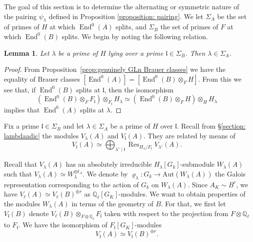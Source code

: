 \documentclass[oneside]{amsart}
\newtheorem{lemma}[theorem]{Lemma}
\theoremstyle{remark}
\newcommand{\Q}{\mathbb Q}
\newcommand{\Aut}{\mathrm{Aut}}
\newcommand{\End}{\operatorname{End}}
\newcommand{\Res}{\operatorname{Res}}
\newcommand{\gl}{\mathfrak{l}}
\numberwithin{equation}{section}
\newcommand{\QQ}{\mathbb{Q}}
\begin{document}
The goal of this section is to determine the alternating or symmetric nature of the pairing $\psi_\lambda$ defined in Proposition \ref{proposition: pairing}. We let $\Sigma_A$ be the set of primes of $H$ at which $\End^0(A)$ splits, and $\Sigma_B$ the set of primes of $F$ at which $\End^0(B)$ splits. We begin by noting the following relation.

\begin{lemma}\label{lemma:gl lambda in Sigma}
	Let $\lambda$ be a prime of $H$ lying over a prime $\gl\in \Sigma_B$. Then $\lambda\in\Sigma_A$.
\end{lemma}
\begin{proof}
	From Proposition~\ref{prop:genuinely GLn Brauer classes} we have the equality of Brauer classes
	\(
		[\End^0(A)] = [\End^0(B)\otimes_F H]
	\).
	From this we see that, if $\End^0(B)$ splits at $\gl$, then the isomorphism 
	\[
	(\End^0(B)\otimes_F F_\gl) \otimes_{F_\gl} H_\lambda \simeq (\End^0(B) \otimes_F H)\otimes_H H_\lambda
	\]
	implies that $\End^0(A)$ splits at $\lambda$.
\end{proof}


Fix a prime $\gl\in\Sigma_B$ and let $\lambda\in \Sigma_A$ be a prime of $H$ over $\gl$. Recall from \S\ref{section: lambdaadic} the modules $V_\lambda(A)$ and $V_\gl(A)$. They are related by means of
\begin{equation}\label{eq:Vgl ResVlambda}
	V_\gl(A) \simeq 
	\bigoplus_{\lambda'\mid \gl} \Res_{H_\lambda/F_\gl}V_{\lambda'}(A).
\end{equation}

Recall that $V_\lambda(A)$ has an absolutely irreducible $H_\lambda[G_k]$-submodule $W_\lambda(A)$ such that $V_\lambda(A) \simeq W_\lambda^{\oplus t_A}$. We denote by $\varrho_\lambda:G_k\to \Aut(W_\lambda(A))$ the Galois representation corresponding to the action of $G_k$ on $W_\lambda(A)$. 
Since $A_K\sim B^r$, we have $V_\ell(A)\simeq V_\ell(B)^{\oplus r}$ as $\QQ_\ell[G_K]$-modules. We want to obtain properties of  the modules $W_\lambda(A)$ in terms of the geometry of $B$. For that, we first let $V_\gl(B)$ denote $ V_\ell(B)\otimes_{F\otimes\QQ_\ell} F_\gl$ taken with respect to  the projection from $F\otimes \Q_\ell$ to $F_\gl$. We have the isomorphism of $F_\gl[G_K]$-modules
\begin{equation}\label{eq:Vgl(A) Vgl(B)^r}
	V_\gl(A) \simeq V_\gl(B)^{\oplus r}.
\end{equation}
\end{document}
